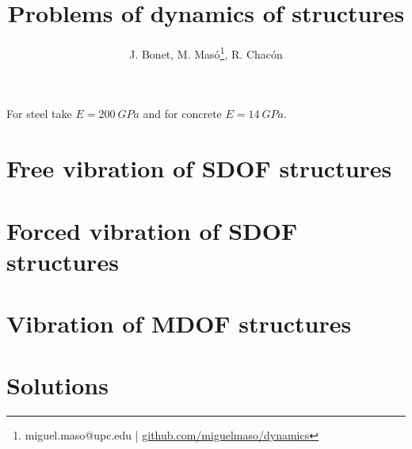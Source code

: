 \documentclass{problems}
\title[Dynamics of structures]{Problems of dynamics of structures}
\author{J. Bonet, M. Masó\footnote{miguel.maso@upc.edu | \href{https://github.com/miguelmaso/dynamics}{github.com/miguelmaso/dynamics}}, R. Chacón}
\begin{document}
\maketitle

For steel take $E=\SI{200}{GPa}$ and for concrete $E=\SI{14}{GPa}$.

\section{Free vibration of SDOF structures}





\section{Forced vibration of SDOF structures}







\section{Vibration of MDOF structures}




\newpage
\section{Solutions}
\shipoutAnswer

{}
\printbibliography
\end{document}
